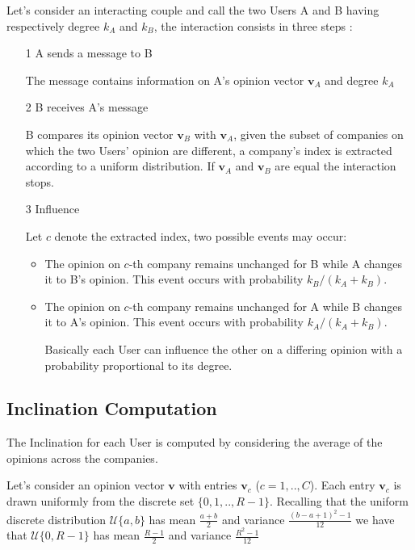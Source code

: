 \documentclass[11pt,a4paper]{article}
\begin{document}
Let's consider an interacting couple and call the two Users A and B having respectively degree $k_A$ and 
$k_B$, the interaction consists in three steps :
\begin{itemize}
	\item[1] A sends a message to B
	\item[] The message contains information on A's opinion vector $\mathbf{v}_A$ and degree $k_A$  
	\item[2] B receives A's message
	\item[] B compares its opinion vector $\mathbf{v}_B$ with $\mathbf{v}_A$, given the subset of companies on which the two Users' opinion are different, a company's index is extracted according to a uniform distribution. If $\mathbf{v}_A$ and $\mathbf{v}_B$ are equal the interaction stops. 
	\item[3] Influence	
	\item[] Let $c$ denote the extracted index, two possible events may occur: 
	\begin{itemize}
		\item The opinion on $c$-th company remains unchanged for B while A changes it to B's opinion. This event occurs with probability $k_B/(k_A + k_B)$.
		\item The opinion on $c$-th company remains unchanged for A while B changes it to A's opinion. This event occurs with probability $k_A/(k_A + k_B)$.
		\item[] Basically each User can influence the other on a differing opinion with a probability proportional to its degree. 	 	
	\end{itemize} 		
\end{itemize}

\subsection{Inclination Computation}

\begin{comment}
Io metterei il calcolo dell'inclination in appendice 
\end{comment}

The Inclination for each User is computed by considering the average of the opinions across the companies.

Let's consider an opinion vector $\mathbf{v}$ with entries $\mathbf{v}_c$ ($ c = 1, .., C $).
Each entry $\mathbf{v}_c$ is drawn uniformly from the discrete set $\{ 0, 1,.., R-1 \}$.
Recalling that the uniform discrete distribution $\mathcal{U}\{a,b\}$ has mean $\frac{a+b}{2}$ and variance ${\frac  {(b-a+1)^{2}-1}{12}}$ we have that $\mathcal{U}\{0,R-1\}$ has mean $\frac{R-1}{2}$ and variance ${\frac  {R^{2}-1}{12}}$
\end{document}
